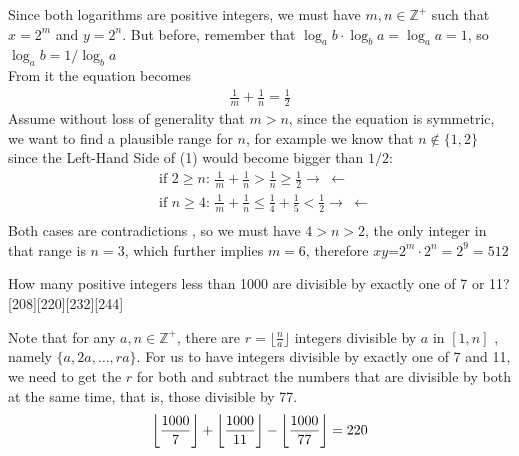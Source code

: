 \documentclass[12pt]{article}
\newcounter{problem}
\begin{document}
\begin{solution}[D]
   Since both logarithms are positive integers, we must have $m,n \in \mathbb{Z}^+$ such that $x=2^m$ and $y=2^n$. But before, remember that 
    $\log_ab \cdot \log_ba = \log_aa=1$, so $\log_ab=1/\log_ba$
    \\From it the equation becomes 
    \begin{align}
        \frac{1}{m} + \frac{1}{n} = \frac{1}{2}
    \end{align}
    Assume without loss of generality that $m>n$, since the equation is symmetric, we want to find a plausible range for $n$, for example we know that $n \notin \{1,2\}$ since the Left-Hand Side of (1) would become bigger than $1/2$:
    \begin{align*}
        &\text{if $2\geq n$:  } \frac{1}{m}+\frac{1}{n} > \frac{1}{n} \geq \frac{1}{2} \rightarrow \hspace{3pt} \leftarrow \\
        &\text{if $n\geq 4$:  } \frac{1}{m}+\frac{1}{n} \leq \frac{1}{4} + \frac{1}{5} < \frac{1}{2} \rightarrow \hspace{3pt} \leftarrow \\
    \end{align*}
    Both cases are contradictions , so we must have $4>n>2$, the only integer in that range is $n=3$, which further implies $m=6$, therefore $xy$=$2^m \cdot 2^n = 2^9=512$
\end{solution}

\begin{problem}
   How many positive integers less than 1000 are divisible by exactly one of 7 or 11?
   [208][220][232][244]
\end{problem}

\begin{solution}[C]
    Note that for any $a,n \in \mathbb{Z}^+$, there are $r=\lfloor \frac{n}{a} \rfloor$ integers divisible by $a$ in $[1,n]$ , namely $\{a,2a,\ldots,ra\}$. For us to have integers divisible by exactly one of 7 and 11, we need to get the $r$ for both and subtract the numbers that are divisible by both at the same time, that is, those divisible by 77.
    $$ \myFloor[7]{1000}+\myFloor[11]{1000}-\myFloor[77]{1000} = 220$$
\end{solution}
\end{document}

